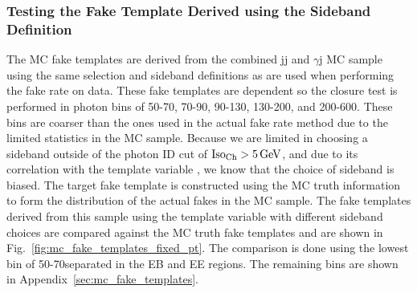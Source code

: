 \subsubsection{Testing the Fake Template Derived using the Sideband Definition}\label{sec:fake_templates_closure_test}

The MC fake templates are derived from the combined jj and $\gamma$j MC sample using the same selection and \chiso sideband definitions as are used when performing the fake rate on data. These fake templates are \pt dependent so the closure test is performed in photon \pt bins of 50-70, 70-90, 90-130, 130-200, and 200-600\GeV. These bins are coarser than the ones used in the actual fake rate method due to the limited statistics in the MC sample. Because we are limited in choosing a sideband outside of the photon ID cut of $\text{Iso}_{\text{Ch}} > 5\,\text{Ge\hspace{-.08em}V}$, and due to its correlation with the template variable \sieie, we know that the choice of sideband is biased. The target fake template is constructed using the MC truth information to form the \sieie distribution of the actual fakes in the MC sample. The fake templates derived from this sample using the \sieie template variable with different \chiso sideband choices are compared against the MC truth fake templates and are shown in Fig.~\ref{fig:mc_fake_templates_fixed_pt}. The comparison is done using the lowest \pt bin of 50-70\GeV separated in the EB and EE regions. The remaining \pt bins are shown in Appendix~\ref{sec:mc_fake_templates}.

